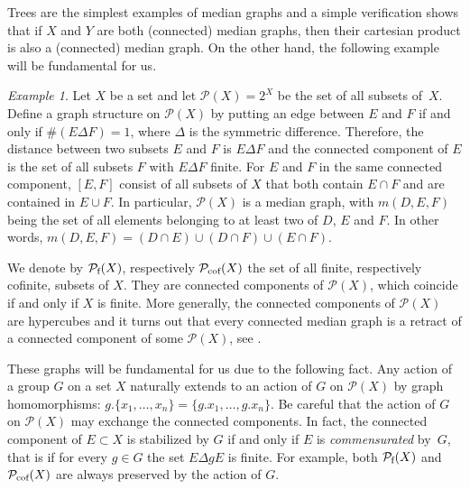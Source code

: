 \documentclass[a4paper]{article}
\theoremstyle{definition}
\theoremstyle{remark}%
\newtheorem{exmp}[lem]{Example}
\newcommand*{\powerset}[1]{\mathcal P(#1)}
\newcommand*{\powersetf}[1]{\mathcal P_{\textnormal{f}}(#1)}
\newcommand*{\powersetcof}[1]{\mathcal P_{\textnormal{cof}}(#1)}
\begin{document}
Trees are the simplest examples of median graphs and a simple verification shows that if $X$ and $Y$ are both (connected) median graphs, then their cartesian product is also a (connected) median graph.
On the other hand, the following example will be fundamental for us.
%
%
\begin{exmp}\label{Ex:MainMedian}
Let $X$ be a set and let  $\powerset{X}=2^X$ be the set of all subsets of~$X$.
Define a graph structure on $\powerset{X}$ by putting an edge between $E$ and $F$ if and only if $\#(E\Delta F)=1$, where $\Delta$ is the symmetric difference.
Therefore, the distance between two subsets $E$ and $F$ is $E\Delta F$ and
the connected component of $E$ is the set of all subsets $F$ with $E\Delta F$ finite.
For $E$ and $F$ in the same connected component, $[E,F]$ consist of all subsets of $X$ that both contain $E\cap F$ and are contained in $E\cup F$.
In particular, $\powerset{X}$ is a median graph, with $m(D,E,F)$ being the set of all elements belonging to at least two of $D$, $E$ and $F$. In other words, $m(D,E,F)=(D\cap E)\cup(D\cap F)\cup(E\cap F)$.
\end{exmp}
%
%
We denote by $\powersetf{X}$, respectively $\powersetcof{X}$ the set of all finite, respectively cofinite, subsets of $X$.
They are connected components of $\powerset{X}$, which coincide if and only if $X$ is finite.
More generally, the connected components of $\powerset{X}$ are hypercubes and it turns out that every connected median graph is a retract of a connected component of some $\powerset{X}$, see \cite{Bandelt1984}.

These graphs will be fundamental for us due to the following fact.
Any action of a group $G$ on a set $X$ naturally extends to an action of $G$ on $\powerset{X}$ by graph homomorphisms: $g.\{x_1,\dots,x_n\}=\{g.x_1,\dots,g.x_n\}$.
Be careful that the action of $G$ on $\powerset{X}$ may exchange the connected components.
In fact, the connected component of $E\subset X$ is stabilized by $G$ if and only if $E$ is \emph{commensurated} by~$G$, that is if for every $g\in G$ the set $E\Delta gE$ is finite.
For example, both $\powersetf{X}$ and $\powersetcof{X}$ are always preserved by the action of $G$.
\end{document}
